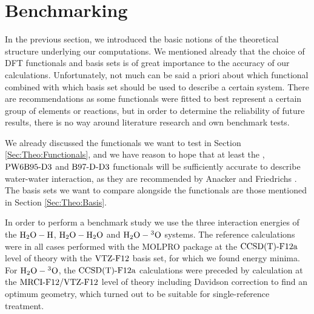 \documentclass[8.5pt,twoside,twocolumn]{article}
\theoremstyle{standard}
\begin{document}

\section{Benchmarking}
\newcommand\htohto{\mbox{\enmat{\hto-\hto}}}
\newcommand\htoo{\mbox{\enmat{\hto-\hspace{.2pt} ^3\te{O}}}}
\newcommand\htoh{\mbox{\enmat{\hto-\te H}}}
\label{Sec:Bench}

In the previous section, we introduced the basic notions of the theoretical
structure underlying our computations. We mentioned already that the choice
of DFT functionals and basis sets is of great importance to the accuracy of our calculations. Unfortunately, not much can be said a priori about
which functional combined with which basis set should be used to describe a certain system.
There are recommendations as some functionals were fitted to best represent a certain
group of elements or reactions, but in order to determine the reliability of
future results, there is no way around literature research and own benchmark
tests.

We already
discussed the functionals we want to test in Section \ref{Sec:Theo:Functionals}, and we
have reason to hope that at least the \pbez, $\text{PW6B95}\text{-D3}$ and $\text{B97-D}\text{-D3}$ functionals will be sufficiently
accurate to describe water-water interaction, as they are recommended by Anacker and Friedrichs \cite{Anacker2014}.
The basis sets we want to compare alongside the functionals are those mentioned
in Section \ref{Sec:Theo:Basis}.

In order to perform a benchmark study we use the three interaction energies of
the $\htoh$, $\htohto$ and $\htoo$ systems.
The reference calculations were in all cases performed with the MOLPRO \cite{MOLPRO_brief} package
at the $\text{CCSD(T)-F12a}$ \cite{KniziaAdlerWerner2009} level of theory with the
$\text{VTZ-F}12$\cite{YousafPeterson2008} basis set, for which we found energy minima.
For $\htoo$, the $\text{CCSD(T)-F12a}$ calculations were preceded by  
calculation at the $\text{MRCI-F12}/\text{VTZ-F}12$\cite{ShiozakiKniziaWerner2011} level of theory
including Davidson correction\cite{LanghoffDavidson1974} to find an optimum
geometry, which turned out to be suitable for single-reference treatment.
\end{document}
